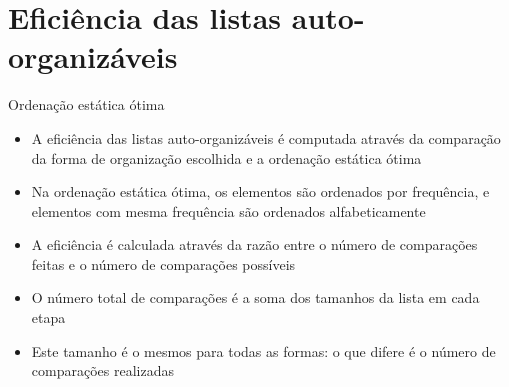 \section{Eficiência das listas auto-organizáveis}

\begin{frame}[fragile]{Ordenação estática ótima}

    \begin{itemize}
        \item A eficiência das listas auto-organizáveis é computada através da comparação da
            forma de organização escolhida e a ordenação estática ótima

        \item Na ordenação estática ótima, os elementos são ordenados por frequência, e elementos
            com mesma frequência são ordenados alfabeticamente

        \item A eficiência é calculada através da razão entre o número de comparações feitas
        e o número de comparações possíveis

        \item O número total de comparações é a soma dos tamanhos da lista em cada etapa

        \item Este tamanho é o mesmos para todas as formas: o que difere é o número de 
            comparações realizadas
    \end{itemize}

\end{frame}

